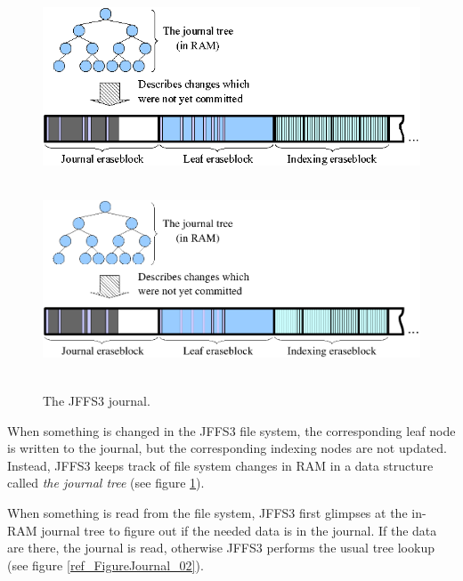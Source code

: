 \documentclass[12pt,a4paper,oneside,titlepage]{article}
\begin{document}
%
%
\begin{figure}[h]
\begin{center}
\begin{htmlonly}
\includegraphics{pics/journal-01.png}
\end{htmlonly}
\includegraphics[width=159mm,height=65mm]{pics/journal-01.pdf}
\end{center}
\caption{The JFFS3 journal.}
\label{ref_FigureJournal_01}
\end{figure}

When something is changed in the JFFS3 file system, the corresponding leaf node
is written to the journal, but the corresponding indexing nodes are not
updated. Instead, JFFS3 keeps track of file system changes in RAM in a data
structure called \emph{the journal tree} (see figure
\ref{ref_FigureJournal_01}).

When something is read from the file system, JFFS3 first glimpses at the
\mbox{in-RAM} journal tree to figure out if the needed data is in the journal.
If the data are  there, the journal is read, otherwise JFFS3 performs the usual
tree lookup (see figure \ref{ref_FigureJournal_02}).
\end{document}
